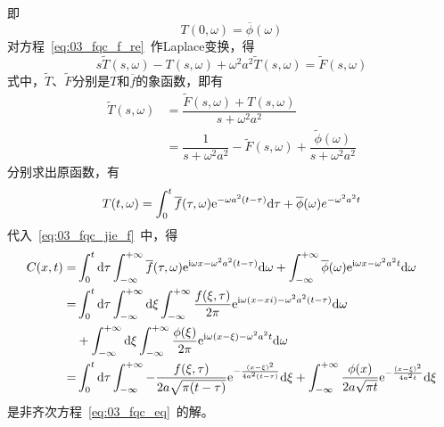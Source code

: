 即
\begin{equation}\label{eq:03_fqc_f_re_bj}
 T(0,\omega)=\overline{\phi}(\omega)
\end{equation}
对方程~\eqref{eq:03_fqc_f_re}~作Laplace变换，得
\begin{equation*}
 s\widetilde{T}(s,\omega)-T(s,\omega)+\omega^2 a^2\widetilde{T}(s,\omega)=\widetilde{F}(s,\omega)
\end{equation*}
式中，$\widetilde{T}$、$\widetilde{F}$分别是$T$和$\overline{f}$的象函数，即有
\begin{equation*}
\begin{aligned}
 \widetilde{T}(s,\omega)&= \dfrac{\widetilde{F}(s,\omega)+T(s,\omega)}{s+\omega^2a^2} \\
                    &= \dfrac{1}{s+\omega^2 a^2}-\widetilde{F}(s,\omega)+\dfrac{\widetilde{\phi}(\omega)}{s+\omega^2 a^2}
\end{aligned}
\end{equation*}
分别求出原函数，有
\begin{equation*}
 T(t,\omega)=\int_0^t\overline{f}(\tau,\omega)\mathrm{e}^{-\omega a^2(t-\tau)}\mathrm{d}\tau+\overline{\phi}(\omega)e^{-\omega^2 a^2 t}
\end{equation*}
代入~\eqref{eq:03_fqc_jie_f}~中，得
\begin{equation}
 \begin{split}
  C(x,t) =&\int_0^t\mathrm{d}\tau\int_{-\infty}^{+\infty}\overline{f}(\tau,\omega)\mathrm{e}^{\mathrm{i}\omega x-\omega^2 a^2(t-\tau)}\mathrm{d}\omega
         +\int_{-\infty}^{+\infty}\overline{\phi}(\omega)\mathrm{e}^{\mathrm{i}\omega x-\omega^2 a^2 t}\mathrm{d}\omega\\
         =&\int_0^t\mathrm{d}\tau\int_{-\infty}^{+\infty}\mathrm{d}\xi\int_{-\infty}^{+\infty}\dfrac{f(\xi,\tau)}{2\pi}\mathrm{e}^{\mathrm{i}\omega(x-xi)-\omega^2 a^2(t-\tau)}\mathrm{d}\omega
         \\&+\int_{-\infty}^{+\infty}\mathrm{d}\xi\int_{-\infty}^{+\infty}\dfrac{\phi(\xi)}{2\pi}\mathrm{e}^{\mathrm{i}\omega(x-\xi)-\omega^2 a^2 t}\mathrm{d}\omega\\
         =&\int_0^t\mathrm{d}\tau\int_{-\infty}^{+\infty}-\dfrac{f(\xi,\tau)}{2a\sqrt{\pi(t-\tau)}}\mathrm{e}^{-\frac{(x-\xi)^2}{4a^2(t-\tau)}}\mathrm{d}\xi
         +\int_{-\infty}^{+\infty}\frac{\phi(x)}{2a\sqrt{\pi t}}\mathrm{e}^{-\frac{(x-\xi)^2}{4a^2 t}}\mathrm{d}\xi
 \end{split}
\end{equation}
是非齐次方程~\eqref{eq:03_fqc_eq}~的解。

